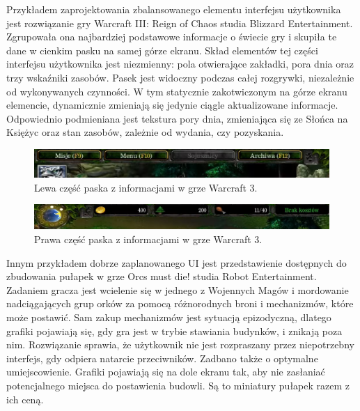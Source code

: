Przykładem zaprojektowania zbalansowanego elementu interfejsu użytkownika jest rozwiązanie gry Warcraft III: Reign of Chaos studia Blizzard Entertainment.
Zgrupowała ona najbardziej podstawowe informacje o świecie gry i skupiła te dane w cienkim pasku na samej górze ekranu. 
Skład elementów tej części interfejsu użytkownika jest niezmienny: pola otwierające zakładki, pora dnia oraz trzy wskaźniki zasobów. Pasek jest widoczny
podczas całej rozgrywki, niezależnie od wykonywanych czynności. W tym statycznie zakotwiczonym na górze ekranu elemencie, dynamicznie
zmieniają się jedynie ciągle aktualizowane informacje. Odpowiednio podmieniana jest tekstura pory dnia, zmieniająca się ze Słońca
na Księżyc oraz stan zasobów, zależnie od wydania, czy pozyskania.

\begin{figure}[htbp]
    \centering
    \includegraphics[width=1.0\textwidth]{images/ui/warcraft3_gorny_pasek_lewy.png}
    \caption{Lewa część paska z informacjami w grze Warcraft 3.}\label{fig:Warcraft3}
\end{figure}

\begin{figure}[htbp]
    \centering
    \includegraphics[width=1.0\textwidth]{images/ui/warcraft3_gorny_pasek_prawy.png}
    \caption{Prawa część paska z informacjami w grze Warcraft 3.}\label{fig:Warcraft3}
\end{figure}

Innym przykładem dobrze zaplanowanego UI jest przedstawienie dostępnych do zbudowania pułapek w grze
Orcs must die! studia Robot Entertainment. Zadaniem gracza jest wcielenie się w jednego z Wojennych Magów i mordowanie nadciągających grup orków za pomocą różnorodnych broni
i mechanizmów, które może postawić. Sam zakup mechanizmów jest sytuacją epizodyczną, dlatego grafiki pojawiają się, gdy gra jest w trybie stawiania budynków, 
i znikają poza nim. Rozwiązanie sprawia, że użytkownik nie jest rozpraszany przez niepotrzebny interfejs, gdy odpiera natarcie przeciwników. Zadbano także o 
optymalne umiejscowienie. Grafiki pojawiają się na dole ekranu tak, aby nie zasłaniać potencjalnego miejsca do postawienia budowli. Są to miniatury pułapek razem z 
ich ceną.

